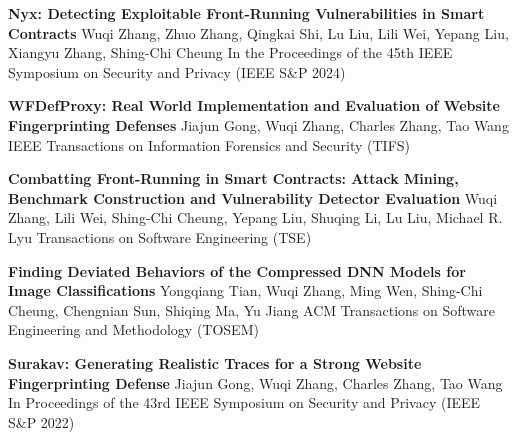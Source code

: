 %
%
%


\begin{scholarship}

	{\textbf{Nyx: Detecting Exploitable Front-Running Vulnerabilities in Smart Contracts}}
	{Wuqi Zhang, Zhuo Zhang, Qingkai Shi, Lu Liu, Lili Wei, Yepang Liu, Xiangyu Zhang, Shing-Chi Cheung}
	\scholarshipentry{}
	{In the Proceedings of the 45th IEEE Symposium on Security and Privacy (IEEE S\&P 2024)}

	{\textbf{WFDefProxy: Real World Implementation and Evaluation of Website Fingerprinting Defenses}}
	{Jiajun Gong, Wuqi Zhang, Charles Zhang, Tao Wang}
	\scholarshipentry{}
	{IEEE Transactions on Information Forensics and Security (TIFS)}

	{\textbf{Combatting Front-Running in Smart Contracts: Attack Mining, Benchmark Construction and Vulnerability Detector Evaluation}}
	{Wuqi Zhang, Lili Wei, Shing-Chi Cheung, Yepang Liu, Shuqing Li, Lu Liu, Michael R. Lyu}
	\scholarshipentry{}
	{Transactions on Software Engineering (TSE)}

	{\textbf{Finding Deviated Behaviors of the Compressed DNN Models for Image Classifications}}
	{Yongqiang Tian, Wuqi Zhang, Ming Wen, Shing-Chi Cheung, Chengnian Sun, Shiqing Ma, Yu Jiang}
	\scholarshipentry{}
	{ACM Transactions on Software Engineering and Methodology (TOSEM)}


	{\textbf{Surakav: Generating Realistic Traces for a Strong Website Fingerprinting Defense}}
	{Jiajun Gong, Wuqi Zhang, Charles Zhang, Tao Wang}
	\scholarshipentry{}
	{In Proceedings of the 43rd IEEE Symposium on Security and Privacy (IEEE S\&P 2022)}


\end{scholarship}
